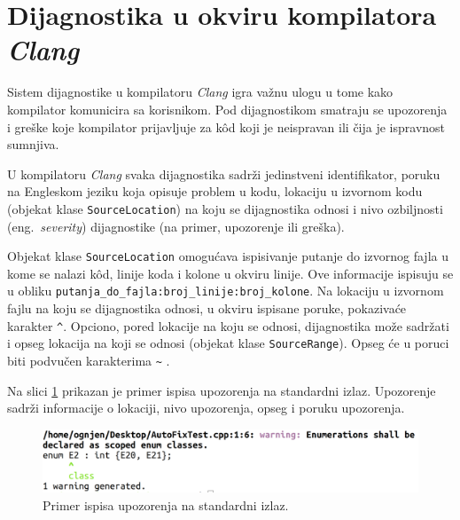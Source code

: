 \documentclass[12pt,oneside]{memoir}
\begin{document}
\section{Dijagnostika u okviru kompilatora \textit{Clang}}
\label{sec:diagnostics}

Sistem dijagnostike u kompilatoru \textit{Clang} igra va\v{z}nu ulogu u tome kako kompilator komunicira sa korisnikom. Pod dijagnostikom
smatraju se upozorenja i gre\v{s}ke koje kompilator prijavljuje za k\^{o}d koji je neispravan ili \v{c}ija je ispravnost sumnjiva. \par
U kompilatoru \textit{Clang} svaka dijagnostika sadr\v{z}i jedinstveni identifikator, poruku na Engleskom jeziku koja opisuje problem u kodu, lokaciju u izvornom kodu (objekat klase \texttt{SourceLocation}) na koju se dijagnostika odnosi i nivo ozbiljnosti (eng.~\textit{severity}) dijagnostike (na primer, upozorenje ili gre\v{s}ka). \par Objekat klase \texttt{SourceLocation} omogu\'{c}ava ispisivanje putanje do izvornog fajla u kome se nalazi k\^{o}d, linije koda i kolone u okviru linije. Ove informacije ispisuju se u obliku \texttt{putanja\_do\_fajla:broj\_linije:broj\_kolone}. Na lokaciju u izvornom fajlu na koju se dijagnostika odnosi, u okviru ispisane poruke, pokaziva\'{c}e karakter \hspace*{1mm} \texttt{\^}. Opciono, pored lokacije na koju se odnosi, dijagnostika mo\v{z}e sadr\v{z}ati i opseg lokacija na koji se odnosi (objekat klase \texttt{SourceRange}). Opseg \'{c}e u poruci biti podvu\v{c}en karakterima \hspace{2mm} \texttt{\~} \cite{CFEWebsite}.
\par
Na slici \ref{fig:warning} prikazan je primer ispisa upozorenja na standardni izlaz. Upozorenje sadr\v{z}i informacije o lokaciji, nivo upozorenja, opseg i poruku upozorenja.

\begin{figure}[!h]
\begin{center}
\includegraphics[scale=0.225]{warning.png}
\end{center}
\caption{Primer ispisa upozorenja na standardni izlaz.}
\label{fig:warning}
\end{figure}
\end{document}
